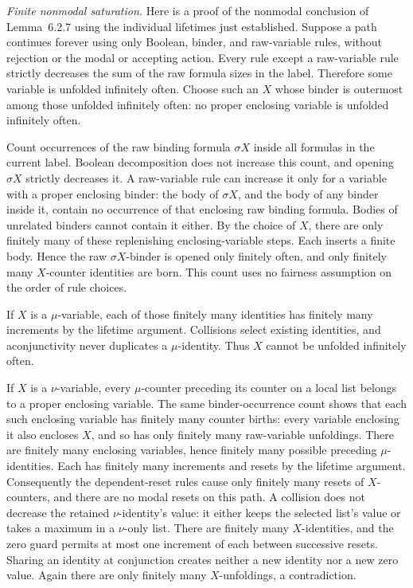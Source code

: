\emph{Finite nonmodal saturation.}
Here is a proof of the nonmodal conclusion of Lemma~6.2.7 using
the individual lifetimes just established. Suppose a path continues
forever using only Boolean, binder, and raw-variable rules, without
rejection or the modal or accepting action. Every rule except a
raw-variable rule strictly decreases the sum of the raw formula
sizes in the label. Therefore some variable is unfolded infinitely
often. Choose such an \(X\) whose binder is outermost among
those unfolded infinitely often: no proper enclosing variable is
unfolded infinitely often.

Count occurrences of the raw binding formula \(\sigma X\)
inside all formulas in the current label. Boolean decomposition
does not increase this count, and opening \(\sigma X\)
strictly decreases it. A raw-variable rule can increase it only
for a variable with a proper enclosing binder: the body of
\(\sigma X\), and the body of any binder inside it, contain
no occurrence of that enclosing raw binding formula. Bodies of
unrelated binders cannot contain it either. By the choice of
\(X\), there are only finitely many of these replenishing
enclosing-variable steps. Each inserts a finite body. Hence the
raw \(\sigma X\)-binder is opened only finitely often, and
only finitely many \(X\)-counter identities are born. This
count uses no fairness assumption on the order of rule choices.

If \(X\) is a \(\mu\)-variable, each of those finitely many
identities has finitely many increments by the lifetime argument.
Collisions select existing identities, and aconjunctivity never
duplicates a \(\mu\)-identity. Thus \(X\) cannot be unfolded
infinitely often.

If \(X\) is a \(\nu\)-variable, every \(\mu\)-counter
preceding its counter on a local list belongs to a proper
enclosing variable. The same binder-occurrence count shows that
each such enclosing variable has finitely many counter births:
every variable enclosing it also encloses \(X\), and so has
only finitely many raw-variable unfoldings. There are finitely
many enclosing variables, hence finitely many possible preceding
\(\mu\)-identities. Each has finitely many increments and
resets by the lifetime argument. Consequently the dependent-reset
rules cause only finitely many resets of \(X\)-counters, and
there are no modal resets on this path. A collision does not
decrease the retained \(\nu\)-identity's value: it either
keeps the selected list's value or takes a maximum in a
\(\nu\)-only list. There are finitely many \(X\)-identities,
and the zero guard permits at most one increment of each between
successive resets. Sharing an identity at conjunction creates
neither a new identity nor a new zero value. Again there are only
finitely many \(X\)-unfoldings, a contradiction.

